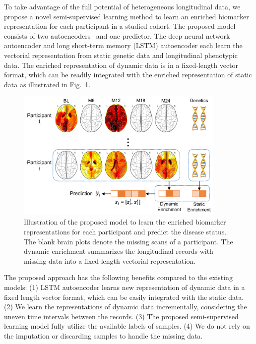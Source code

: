 To take advantage of the full potential of heterogeneous longitudinal data, we propose a novel semi-supervised learning method to learn an enriched biomarker representation for each participant in a studied cohort. The proposed model consists of two autoencoders~\cite{kramer1991nonlinear} and one predictor. The deep neural network autoencoder and long short-term memory (LSTM) autoencoder each learn the vectorial representation from static genetic data and longitudinal phenotypic data. The enriched representation of dynamic data is in a fixed-length vector format, which can be readily integrated with the enriched representation of static data as illustrated in Fig.~\ref{fig: overview}.
\begin{figure}[h]
    \centering
    \includegraphics[width=0.9\textwidth]{images/overview.pdf}
    \caption{Illustration of the proposed model to learn the enriched biomarker representations for each participant and predict the disease status. The blank brain plots denote the missing scans of a participant. The dynamic enrichment summarizes the longitudinal records with missing data into a fixed-length vectorial representation.} \label{fig: overview}
\end{figure}
The proposed approach has the following benefits compared to the existing models:
(1) LSTM autoencoder learns new representation of dynamic data in a fixed length vector format, which can be easily integrated with the static data.
(2) We learn the representations of dynamic data incrementally, considering the uneven time intervals between the records.
(3) The proposed semi-supervised learning model fully utilize the available labels of samples.
(4) We do not rely on the imputation or discarding samples to handle the missing data.

